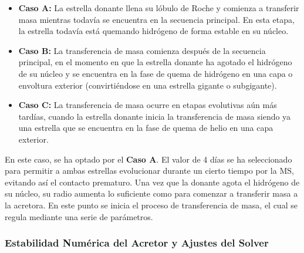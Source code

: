 \begin{itemize}
  \item \textbf{Caso A:} La estrella donante llena su lóbulo de Roche y comienza a transferir masa mientras todavía se encuentra en la secuencia principal. En esta etapa, la estrella todavía está quemando hidrógeno de forma estable en su núcleo.
  \item \textbf{Caso B:} La transferencia de masa comienza después de la secuencia principal, en el momento en que la estrella donante ha agotado el hidrógeno de su núcleo y se encuentra en la fase de quema de hidrógeno en una capa o envoltura exterior (convirtiéndose en una estrella gigante o subgigante).
  \item \textbf{Caso C:} La transferencia de masa ocurre en etapas evolutivas aún más tardías, cuando la estrella donante inicia la transferencia de masa siendo ya una estrella que se encuentra en la fase de quema de helio en una capa exterior.
\end{itemize}

En este caso, se ha optado por el \textbf{Caso A}. El valor de 4 días se ha seleccionado para permitir a ambas estrellas evolucionar durante un cierto tiempo por la MS, evitando así el contacto prematuro. Una vez que la donante agota el hidrógeno de su núcleo, su radio aumenta lo suficiente como para comenzar a transferir masa a la acretora. En este punto se inicia el proceso de transferencia de masa, el cual se regula mediante una serie de parámetros.

\subsubsection{Estabilidad Numérica del Acretor y Ajustes del Solver}

